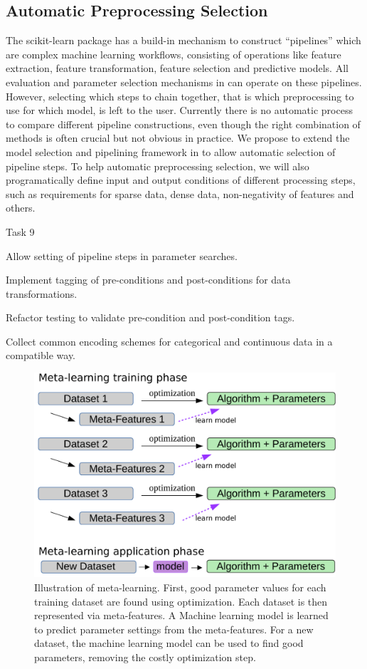 \subsection{Automatic Preprocessing Selection}
The scikit-learn \sklearn{} package has a build-in mechanism to construct
``pipelines'' which are complex machine learning workflows, consisting of
operations like feature extraction, feature transformation, feature selection
and predictive models.  All evaluation and parameter selection mechanisms in
\sklearn{} can operate on these pipelines.
However, selecting which steps to chain together, that is which preprocessing
to use for which model, is left to the user. Currently there is no
automatic process to compare different pipeline constructions, even though
the right combination of methods is often crucial but not obvious in practice.
We propose to extend the model selection and pipelining framework in \sklearn{}
to allow automatic selection of pipeline steps.
\enlargethispage{\baselineskip}
To help automatic preprocessing selection, we will also programatically
define input and output conditions of different processing steps, such
as requirements for sparse data, dense data, non-negativity of features and others.
\begin{labeling}{Task 9}
    \itemsep-4pt
    \item [Task 6] Allow setting of pipeline steps in \sklearn{} parameter searches.
    \item [Task 7] Implement tagging of pre-conditions and post-conditions for data transformations.
    \item [Task 8] Refactor \sklearn{} testing to validate pre-condition and post-condition tags.
    \item [Task 9] Collect common encoding schemes for categorical and
        continuous data in a \sklearn{} compatible way.
\end{labeling}

\begin{figure}
    \centering
    \includegraphics[width=.6\linewidth]{meta-learning-diagram.pdf}
    \caption{Illustration of meta-learning. First, good parameter values for
        each training dataset are found using optimization. Each dataset is
        then represented via meta-features. A Machine learning model is learned
        to predict parameter settings from the meta-features. For a new
        dataset, the machine learning model can be used to find good
    parameters, removing the costly optimization step.}
    \label{meta-learning}
\end{figure}

